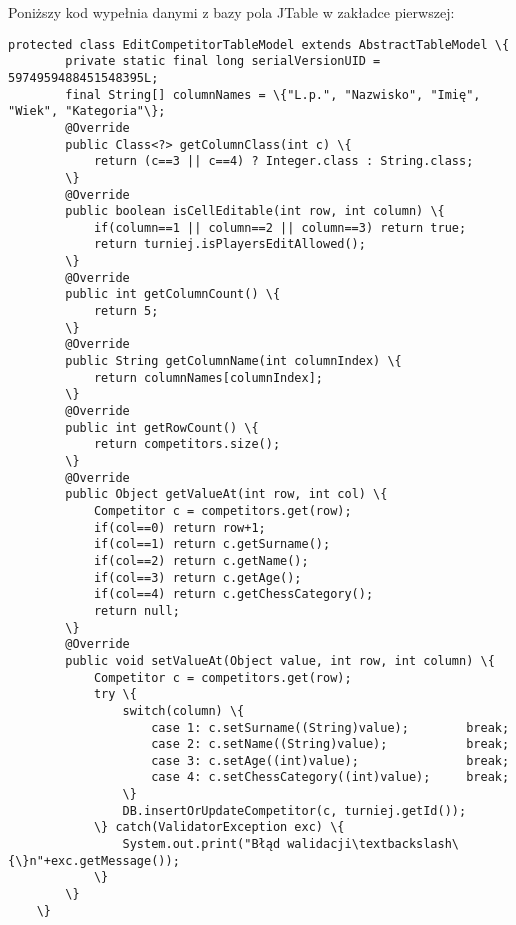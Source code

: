 Poniższy kod wypełnia danymi z bazy pola JTable w zakładce pierwszej:
\begin{verbatim}
protected class EditCompetitorTableModel extends AbstractTableModel \{
		private static final long serialVersionUID = 5974959488451548395L;
		final String[] columnNames = \{"L.p.", "Nazwisko", "Imię", "Wiek", "Kategoria"\};
		@Override
    	public Class<?> getColumnClass(int c) \{ 
    		return (c==3 || c==4) ? Integer.class : String.class;
    	\}
    	@Override
    	public boolean isCellEditable(int row, int column) \{
    		if(column==1 || column==2 || column==3) return true;
    		return turniej.isPlayersEditAllowed();
    	\}
		@Override
		public int getColumnCount() \{
			return 5;
		\}
		@Override
		public String getColumnName(int columnIndex) \{
			return columnNames[columnIndex];
		\}
		@Override
		public int getRowCount() \{
			return competitors.size();
		\}
		@Override
		public Object getValueAt(int row, int col) \{
			Competitor c = competitors.get(row);
			if(col==0) return row+1;
			if(col==1) return c.getSurname();
			if(col==2) return c.getName();
			if(col==3) return c.getAge();
			if(col==4) return c.getChessCategory();
	        return null;
		\}
		@Override
		public void setValueAt(Object value, int row, int column) \{
			Competitor c = competitors.get(row);
			try \{
				switch(column) \{
					case 1: c.setSurname((String)value); 		break;
					case 2: c.setName((String)value); 			break;
					case 3: c.setAge((int)value); 				break;
					case 4: c.setChessCategory((int)value); 	break;
				\}
				DB.insertOrUpdateCompetitor(c, turniej.getId());
			\} catch(ValidatorException exc) \{
				System.out.print("Błąd walidacji\textbackslash\{\}n"+exc.getMessage());
			\}
		\}
	\}
\end{verbatim} 

